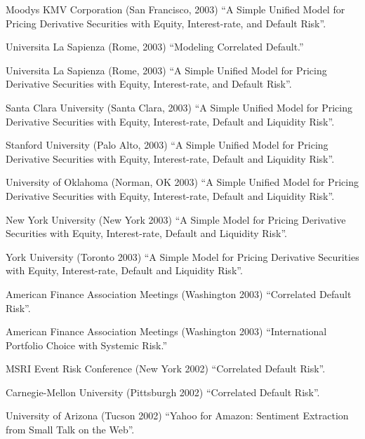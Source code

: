 \documentclass{article}
\begin{document}
\begin{etaremune}
{\item Moodys KMV Corporation (San Francisco, 2003)
``A Simple Unified Model for Pricing Derivative Securities with
Equity, Interest-rate, and Default Risk''.

\item Universita La Sapienza (Rome, 2003)
``Modeling Correlated Default.''

\item Universita La Sapienza (Rome, 2003)
``A Simple Unified Model for Pricing Derivative Securities with
Equity, Interest-rate, and Default Risk''.

\item Santa Clara University (Santa Clara, 2003)
``A Simple Unified Model for Pricing Derivative Securities with
Equity, Interest-rate, Default and Liquidity Risk''.

\item Stanford University (Palo Alto, 2003)
``A Simple Unified Model for Pricing Derivative Securities with
Equity, Interest-rate, Default and Liquidity Risk''.

\item University of Oklahoma (Norman, OK 2003)
``A Simple Unified Model for Pricing Derivative Securities with
Equity, Interest-rate, Default and Liquidity Risk''.

\item New York University (New York 2003)
``A Simple Model for Pricing Derivative Securities with
Equity, Interest-rate, Default and Liquidity Risk''.

\item York University (Toronto 2003)
``A Simple Model for Pricing Derivative Securities with
Equity, Interest-rate, Default and Liquidity Risk''.


\item American Finance Association Meetings (Washington 2003)
``Correlated Default Risk''.


\item American Finance Association Meetings (Washington 2003)
``International Portfolio Choice with Systemic Risk.''


\item MSRI Event Risk Conference (New York 2002)
``Correlated Default Risk''.

\item Carnegie-Mellon University (Pittsburgh 2002)
``Correlated Default Risk''.



\item University of Arizona (Tucson 2002)
``Yahoo for Amazon: Sentiment Extraction from Small Talk on the Web''. 

}
\end{etaremune}
\end{document}
